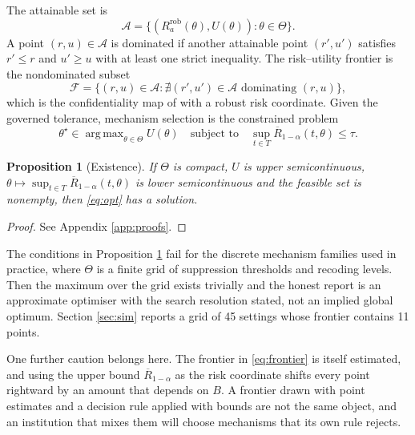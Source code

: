 \documentclass[11pt,a4paper]{article}
\theoremstyle{plain}
\newtheorem{proposition}{Proposition}
\theoremstyle{definition}
\DeclareMathOperator*{\argmax}{arg\,max}
\begin{document}
The attainable set is
\begin{equation}
\mathcal{A} = \{(R_a^{\mathrm{rob}}(\theta), U(\theta)) : \theta \in \Theta\} .
\label{eq:attain}
\end{equation}
A point $(r, u) \in \mathcal{A}$ is dominated if another attainable point $(r', u')$
satisfies $r' \leq r$ and $u' \geq u$ with at least one strict inequality. The
risk--utility frontier is the nondominated subset
\begin{equation}
\mathcal{F} = \{(r, u) \in \mathcal{A} : \nexists (r', u') \in \mathcal{A} \text{ dominating } (r, u)\} ,
\label{eq:frontier}
\end{equation}
which is the confidentiality map of \citet{duncan2001} with a robust risk
coordinate. Given the governed tolerance, mechanism selection is the
constrained problem
\begin{equation}
\theta^\star \in \argmax_{\theta \in \Theta} U(\theta)
\quad \text{subject to} \quad \sup_{t \in T} \overline{R}_{1-\alpha}(t, \theta) \leq \tau .
\label{eq:opt}
\end{equation}

\begin{proposition}[Existence]\label{prop:exist}
If $\Theta$ is compact, $U$ is upper semicontinuous, $\theta \mapsto \sup_{t \in
T} \overline{R}_{1-\alpha}(t, \theta)$ is lower semicontinuous and the feasible set is
nonempty, then \eqref{eq:opt} has a solution.
\end{proposition}

\begin{proof}
See Appendix \ref{app:proofs}.
\end{proof}

The conditions in Proposition \ref{prop:exist} fail for the discrete mechanism
families used in practice, where $\Theta$ is a finite grid of suppression
thresholds and recoding levels. Then the maximum over the grid
exists trivially and the honest report is an approximate optimiser with the
search resolution stated, not an implied global optimum. Section \ref{sec:sim} reports a grid of 45 settings whose frontier contains 11
points.

One further caution belongs here. The frontier in \eqref{eq:frontier} is itself
estimated, and using the upper bound $\overline{R}_{1-\alpha}$ as the risk coordinate
shifts every point rightward by an amount that depends on $B$. A frontier drawn
with point estimates and a decision rule applied with bounds are not the same
object, and an institution that mixes them will choose mechanisms that its own
rule rejects.
\end{document}
